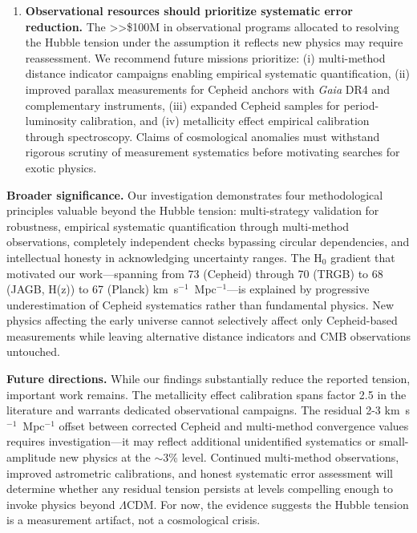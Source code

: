 \documentclass[twocolumn, linenumbers]{aastex701}
\begin{document}
\begin{enumerate}
\item \textbf{Observational resources should prioritize systematic error reduction.} The >>\$100M in observational programs allocated to resolving the Hubble tension under the assumption it reflects new physics may require reassessment. We recommend future missions prioritize: (i) multi-method distance indicator campaigns enabling empirical systematic quantification, (ii) improved parallax measurements for Cepheid anchors with \textit{Gaia} DR4 and complementary instruments, (iii) expanded Cepheid samples for period-luminosity calibration, and (iv) metallicity effect empirical calibration through spectroscopy. Claims of cosmological anomalies must withstand rigorous scrutiny of measurement systematics before motivating searches for exotic physics.

\end{enumerate}

\textbf{Broader significance.} Our investigation demonstrates four methodological principles valuable beyond the Hubble tension: multi-strategy validation for robustness, empirical systematic quantification through multi-method observations, completely independent checks bypassing circular dependencies, and intellectual honesty in acknowledging uncertainty ranges. The H$_0$ gradient that motivated our work---spanning from 73 (Cepheid) through 70 (TRGB) to 68 (JAGB, H(z)) to 67 (Planck) km~s$^{-1}$~Mpc$^{-1}$---is explained by progressive underestimation of Cepheid systematics rather than fundamental physics. New physics affecting the early universe cannot selectively affect only Cepheid-based measurements while leaving alternative distance indicators and CMB observations untouched.

\textbf{Future directions.} While our findings substantially reduce the reported tension, important work remains. The metallicity effect calibration spans factor 2.5 in the literature and warrants dedicated observational campaigns. The residual 2-3 km~s$^{-1}$~Mpc$^{-1}$ offset between corrected Cepheid and multi-method convergence values requires investigation---it may reflect additional unidentified systematics or small-amplitude new physics at the $\sim$3\% level. Continued multi-method observations, improved astrometric calibrations, and honest systematic error assessment will determine whether any residual tension persists at levels compelling enough to invoke physics beyond $\Lambda$CDM. For now, the evidence suggests the Hubble tension is a measurement artifact, not a cosmological crisis.
\end{document}
